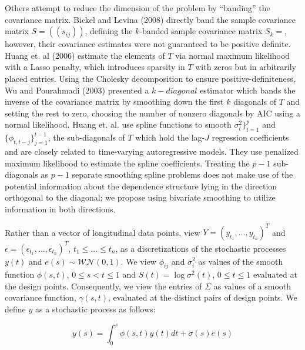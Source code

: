 Others attempt to reduce the dimension of the problem by ``banding'' the covariance matrix. Bickel and Levina (2008) directly band the sample covariance matrix $S = \left(\left( s_{ij}\right) \right)$, defining the $k$-banded sample covariance matrix $S_k = $, however, their covariance estimates were not guaranteed to be positive definite. Huang et. al (2006) estimate the elements of $T$ via normal maximum likelihood with a Lasso penalty, which introduces sparsity in $T$ with zeros but in arbitrarily placed entries. Using the Cholesky decomposition to ensure positive-definiteness, Wu and Pourahmadi (2003) presented a $k-diagonal$ estimator which bands the inverse of the covariance matrix by smoothing down the first $k$ diagonals of $T$ and setting the rest to zero, choosing the number of nonzero diagonals by AIC using a normal likelihood. Huang et. al. use spline functions to smooth $\sigma_t^2\rbrace_{t=1}^p$ and $\lbrace \phi_{t,t-j} \rbrace_{j=1}^{t-1}$, the sub-diagonals of $T$ which hold the lag-$J$ regression coefficients and are closely related to time-varying autoregressive models. They use penalized maximum likelihood to estimate the spline coefficients. Treating the $p-1$ sub-diagonals as $p-1$ separate smoothing spline problems does not make use of the potential information about the dependence structure lying in the direction orthogonal to the diagonal; we propose using bivariate smoothing to utilize information in both directions.
 
Rather than a vector of longitudinal data points, view $Y = \left(y_{t_1}, \dots, y_{t_n}\right)^T$ and $\epsilon = \left(\epsilon_{t_1}, \dots, \epsilon_{t_n}\right)^T$, ${t_1} \le \dots \le {t_n}$, as a discretizations of the stochastic processes $y\left(t\right)$ and $e\left(s\right) \sim \mathcal{WN}\left(0,1\right)$.  We view $\phi_{ij}$ and $\sigma_i^2$ as values of the smooth function $\phi\left(s,t\right)$, $0 \le s < t \le 1$ and $S\left(t\right) = \log \sigma^2\left(t \right)$, $0 \le t \le 1$ evaluated at the design points. Consequently, we view the entries of $\Sigma$ as values of a smooth covariance function, $\gamma\left(s,t\right)$, evaluated at the distinct pairs of design points. We define $y$ as a stochastic process as follows:

 \begin{equation}
 y\left(s\right) = \int_0^s \phi\left(s,t\right)y\left(t\right)dt + \sigma\left(s\right)e\left(s\right)
 \end{equation}
 
